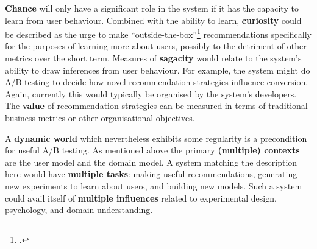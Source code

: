 \textbf{Chance} will only have a significant role in the system if it
has the capacity to learn from user behaviour.
Combined with the ability to learn, \textbf{curiosity} could be
described as the urge to make
``outside-the-box''\footnote{.}
recommendations specifically for the purposes of learning more about
users, possibly to the detriment of other metrics over the short term.
Measures of \textbf{sagacity} would relate to the system's ability to
draw inferences from user behaviour.  For example, the system might do
A/B testing to decide how novel recommendation strategies influence
conversion.  Again, currently this would typically be organised by the
system's developers.  The \textbf{value} of recommendation strategies
can be measured in terms of traditional business metrics or other
organisational objectives.

A \textbf{dynamic world} which nevertheless exhibits some regularity
is a precondition for useful A/B testing.  As mentioned above the
primary \textbf{(multiple) contexts} are the user model and the domain
model.  A system matching the description here would have
\textbf{multiple tasks}: making useful recommendations, generating new
experiments to learn about users, and building new models.  Such a
system could avail itself of \textbf{multiple influences} related to
experimental design, psychology, and domain understanding.

